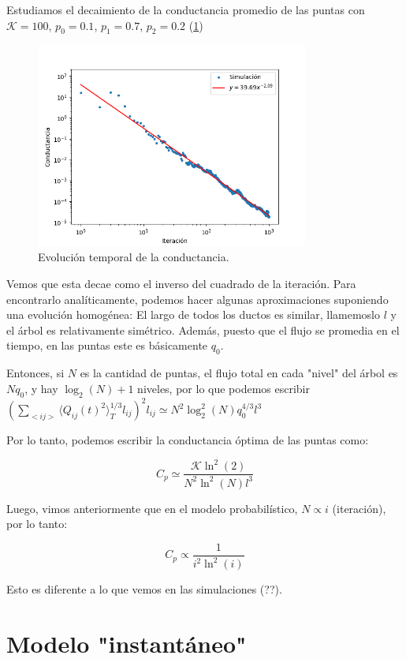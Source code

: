 \documentclass{article}
\begin{document}
Estudiamos el decaimiento de la conductancia promedio de las puntas con $\mathcal{K}=100$, $p_0 = 0.1$, $p_1 = 0.7$, $p_2 = 0.2$ (\ref{fig:evolucion_conductancia_proba})
\begin{figure}[h!]
    \centering
    \includegraphics[width=0.8\textwidth]{graficos_proba/Cij_vs_tiempo.png}
    \caption{Evolución temporal de la conductancia.}
    \label{fig:evolucion_conductancia_proba}
\end{figure}

Vemos que esta decae como el inverso del cuadrado de la iteración.
Para encontrarlo analíticamente, podemos hacer algunas aproximaciones suponiendo una evolución homogénea: El largo de todos los ductos es similar, llamemoslo $l$ y el árbol es relativamente simétrico. Además, puesto que el flujo se promedia en el tiempo, en las puntas este es básicamente $q_0$.

Entonces, si $N$ es la cantidad de puntas, el flujo total en cada "nivel" del árbol es $Nq_0$, y hay $\log_2(N)+1$ niveles, por lo que podemos escribir $\left( \sum_{<ij>} \langle Q_{ij}(t)^2\rangle_T^{1/3} l_{ij}\right)^2 l_{ij} \simeq N^{2}\log_2^{2}(N)q_0^{4/3}l^{3}$

Por lo tanto, podemos escribir la conductancia óptima de las puntas como:

$$ C_p \simeq \dfrac{\mathcal{K} \ln^2(2)}{N^{2}\ln^{2}(N)l^{3}} $$

Luego, vimos anteriormente que en el modelo probabilístico, $N \propto i$ (iteración), por lo tanto:

$$ C_p \propto \frac{1}{i^2 \ln^2(i)} $$

Esto es diferente a lo que vemos en las simulaciones (??).

\section{Modelo "instantáneo"}
\end{document}
